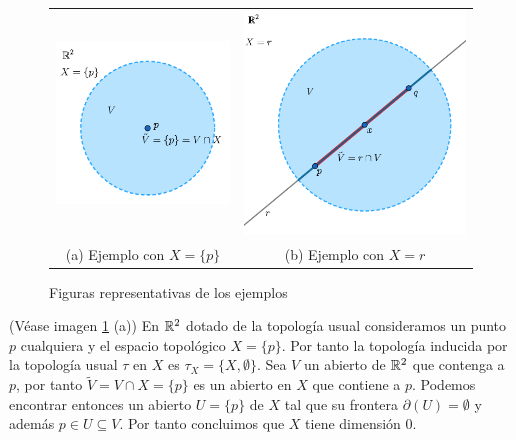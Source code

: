 \begin{figure}[ht]
\begin{tabular}{cc}
\includegraphics[scale=0.5]{./img/ejemplo-dimension-1.png} &   \includegraphics[scale=0.45]{./img/ejemplo-dimension-2.png} \\
(a) Ejemplo con $X=\{p\}$ & (b) Ejemplo con $X=r$ \\[6pt]
\end{tabular}
\caption{Figuras representativas de los ejemplos}
\label{fig:ejemplos}
\end{figure}


\begin{ejemplo}
\label{ej:dimension-1}
(Véase imagen \ref{fig:ejemplos} (a))
En $\mathbb{R}^2$ dotado de la topología usual consideramos un punto $p$ cualquiera y el espacio topológico $X=\{p\}$. Por tanto la topología inducida por la topología usual $\tau$ en $X$ es $\tau_X=\{X,\emptyset\}$. Sea $V$ un abierto de $\mathbb{R}^2$ que contenga a $p$, por tanto $\tilde{V} = V \cap X = \{p\}$ es un abierto en $X$ que contiene a $p$. Podemos encontrar entonces un abierto $U=\{p\}$ de $X$ tal que su frontera $\partial(U)=\emptyset$ y además $p\in U \subseteq V$. Por tanto concluimos que $X$ tiene dimensión 0.
\end{ejemplo}

